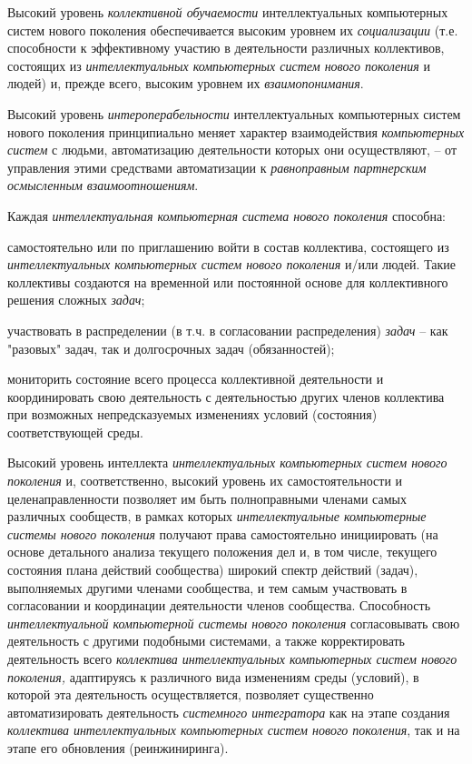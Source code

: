 Высокий уровень \textit{коллективной обучаемости} интеллектуальных компьютерных систем нового поколения обеспечивается высоким уровнем их \textit{социализации} (т.е. способности к эффективному участию в деятельности различных коллективов, состоящих из \textit{интеллектуальных компьютерных систем нового поколения} и людей) и, прежде всего, высоким уровнем их \textit{взаимопонимания}.

Высокий уровень \textit{интероперабельности} интеллектуальных компьютерных систем нового поколения принципиально меняет характер взаимодействия \textit{компьютерных систем} с людьми, автоматизацию деятельности которых они осуществляют, -- от управления этими средствами автоматизации к \textit{равноправным партнерским осмысленным взаимоотношениям}.

Каждая \textit{интеллектуальная компьютерная система нового поколения} способна:

\begin{textitemize}
	\item
	самостоятельно или по приглашению войти в состав коллектива, состоящего из \textit{интеллектуальных компьютерных систем нового поколения} и/или людей. Такие коллективы создаются на временной или постоянной основе для коллективного решения сложных \textit{задач};
	\item
	участвовать в распределении (в т.ч. в согласовании распределения) \textit{задач} -- как "разовых"{} задач, так и долгосрочных задач (обязанностей);
	\item
	мониторить состояние всего процесса коллективной деятельности и координировать свою деятельность с деятельностью других членов коллектива при возможных непредсказуемых изменениях условий (состояния) соответствующей среды.
\end{textitemize}

Высокий уровень интеллекта \textit{интеллектуальных компьютерных систем нового поколения} и, соответственно, высокий уровень их самостоятельности и целенаправленности позволяет им быть полноправными членами самых различных сообществ, в рамках которых \textit{интеллектуальные компьютерные системы нового поколения} получают права самостоятельно инициировать (на основе детального анализа текущего положения дел и, в том числе, текущего состояния плана действий сообщества) широкий спектр действий (задач), выполняемых другими членами сообщества, и тем самым участвовать в согласовании и координации деятельности членов сообщества. Способность \textit{интеллектуальной компьютерной системы нового поколения} согласовывать свою деятельность с другими подобными системами, а также корректировать деятельность всего \textit{коллектива интеллектуальных компьютерных систем нового поколения,} адаптируясь к различного вида изменениям среды (условий), в которой эта деятельность осуществляется, позволяет существенно автоматизировать деятельность \textit{системного интегратора} как на этапе создания \textit{коллектива интеллектуальных компьютерных систем нового поколения}, так и на этапе его обновления (реинжиниринга).


